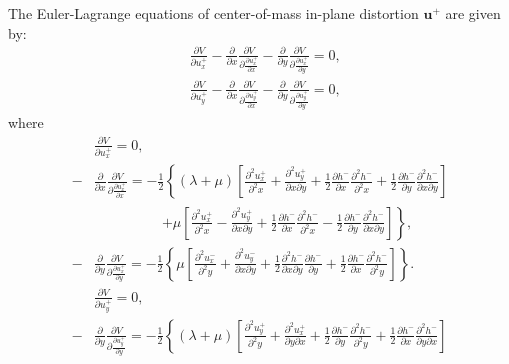 \documentclass[aps,prx,10pt,twocolumn,superscriptaddress]{revtex4}
\begin{document}
\begin{widetext}
The Euler-Lagrange equations of center-of-mass in-plane distortion $\textbf{u}^{+}$ are given by:
\begin{equation}\label{eq:elup}
\begin{split}
&\frac{\partial V}{\partial u^{+}_{x}}-\frac{\partial }{\partial x}\frac{\partial V}{\partial \frac{\partial u^{+}_{x}}{\partial x}}-\frac{\partial }{\partial y}\frac{\partial V}{\partial \frac{\partial u^{+}_{x}}{\partial y}}=0,\\
&\frac{\partial V}{\partial u^{+}_{y}}-\frac{\partial }{\partial x}\frac{\partial V}{\partial \frac{\partial u^{+}_{y}}{\partial x}}-\frac{\partial }{\partial y}\frac{\partial V}{\partial \frac{\partial u^{+}_{y}}{\partial y}}=0,
\end{split}
\end{equation}
where
\begin{equation}
\begin{split}
&\frac{\partial V}{\partial u^{+}_{x}}=0,\\
-&\frac{\partial }{\partial x}\frac{\partial V}{\partial \frac{\partial u^{+}_{x}}{\partial x}}=-\frac{1}{2}\left\{ (\lambda+\mu)\left[ \frac{\partial^{2}u^{+}_{x}}{\partial^{2}x}+ \frac{\partial^{2}u^{+}_{y}}{\partial x\partial y}+\frac{1}{2}\frac{\partial h^{-}}{\partial x}\frac{\partial^{2}h^{-}}{\partial^{2}x}+\frac{1}{2}\frac{\partial h^{-}}{\partial y}\frac{\partial^{2}h^{-}}{\partial x\partial y} \right] \right.\\
&\ \ \ \ \ \ \ \ \ \ \ \ \ \ \ \ \ \ \ \ \ \ \left.+\mu\left[\frac{\partial^{2}u^{+}_{x}}{\partial^{2}x}- \frac{\partial^{2}u^{+}_{y}}{\partial x\partial y}+\frac{1}{2}\frac{\partial h^{-}}{\partial x}\frac{\partial^{2}h^{-}}{\partial^{2}x}-\frac{1}{2}\frac{\partial h^{-}}{\partial y}\frac{\partial^{2}h^{-}}{\partial x\partial y}\right]\right\},\\
-&\frac{\partial }{\partial y}\frac{\partial V}{\partial \frac{\partial u^{+}_{x}}{\partial y}}=-\frac{1}{2}\left\{\mu\left[\frac{\partial^{2}u^{-}_{x}}{\partial^{2}y}+\frac{\partial^{2}u^{-}_{y}}{\partial x \partial y}+\frac{1}{2}\frac{\partial^{2}h^{-}}{\partial x\partial y}\frac{\partial h^{-}}{\partial y}+\frac{1}{2}\frac{\partial h^{-}}{\partial x}\frac{\partial^{2}h^{-}}{\partial^{2}y} \right]\right\}.\\
&\frac{\partial V}{\partial u^{+}_{y}}=0,\\
-&\frac{\partial }{\partial y}\frac{\partial V}{\partial \frac{\partial u^{+}_{y}}{\partial y}}=-\frac{1}{2}\left\{ (\lambda+\mu)\left[ \frac{\partial^{2}u^{+}_{y}}{\partial^{2}y}+ \frac{\partial^{2}u^{+}_{x}}{\partial y\partial x}+\frac{1}{2}\frac{\partial h^{-}}{\partial y}\frac{\partial^{2}h^{-}}{\partial^{2}y}+\frac{1}{2}\frac{\partial h^{-}}{\partial x}\frac{\partial^{2}h^{-}}{\partial y\partial x} \right] \right.\\

\end{split}
\end{equation}
\end{widetext}
\end{document}
